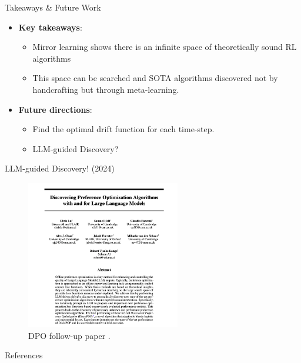 \documentclass[9pt]{beamer}
\begin{document}
\begin{frame}{Takeaways \& Future Work}

  \begin{itemize}
    \vfill
    \item \textbf{Key takeaways}:
  \begin{itemize}
      \item Mirror learning shows there is an infinite space of theoretically sound RL algorithms
      \vfill
      \pause
      \item This space can be searched and SOTA algorithms discovered not by handcrafting but through meta-learning.
  \end{itemize}

  \pause
    \vfill
    \item \textbf{Future directions}:
  \begin{itemize}
    \item Find the optimal drift function for each time-step.
    \vfill
    \pause
    
    \item LLM-guided Discovery?
    \vfill
  \end{itemize}
\end{itemize}

\end{frame}

\begin{frame}{LLM-guided Discovery! (2024)}

  \begin{figure}
    \centering
    \includegraphics[width=0.6\textwidth]{figures/llm_disco.png}
    \caption{DPO follow-up paper \cite{lu2024discovering}.}
    \label{fig:trl10}
  \end{figure}
  
\end{frame}



\begin{frame}[t, allowframebreaks]{References}
\printbibliography[heading=none]
\end{frame}

\makeoutro
\end{document}
